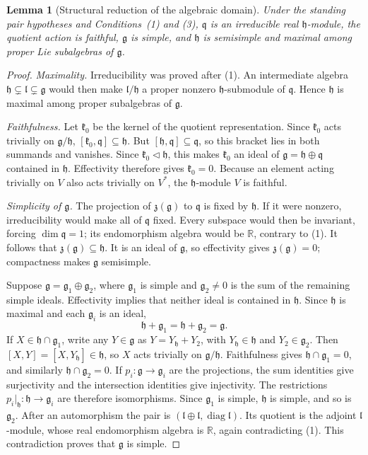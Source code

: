 \documentclass[11pt]{article}
\newtheorem{lemma}[theorem]{Lemma}
\theoremstyle{remark}
\newcommand{\g}{\mathfrak g}
\newcommand{\h}{\mathfrak h}
\newcommand{\q}{\mathfrak q}
\begin{document}
\begin{lemma}[Structural reduction of the algebraic domain]
\label{lem:reduction}
Under the standing pair hypotheses and Conditions~\textup{(1)} and
\textup{(3)}, \(\q\) is an irreducible real
\(\h\)-module, the quotient action is faithful, \(\g\) is simple, and
\(\h\) is semisimple and maximal among proper Lie subalgebras of
\(\g\).
\end{lemma}
\begin{proof}
\emph{Maximality.}
Irreducibility was proved after (1). An intermediate algebra
\(\h\subsetneq\mathfrak l\subsetneq\g\) would then make
\(\mathfrak l/\h\) a proper nonzero \(\h\)-submodule of \(\q\).
Hence \(\h\) is maximal among proper subalgebras of \(\g\).

\emph{Faithfulness.}
Let \(\mathfrak k_0\) be the kernel of the quotient representation.
Since \(\mathfrak k_0\) acts trivially on \(\g/\h\),
\([\mathfrak k_0,\q]\subseteq\h\). But
\([\h,\q]\subseteq\q\), so this bracket lies in both summands and
vanishes. Since \(\mathfrak k_0\triangleleft\h\), this makes
\(\mathfrak k_0\) an ideal of \(\g=\h\oplus\q\) contained in \(\h\).
Effectivity therefore gives \(\mathfrak k_0=0\).
Because an element acting trivially on \(V\) also acts trivially on
\(V^*\), the \(\h\)-module \(V\) is faithful.

\emph{Simplicity of \(\g\).}
The projection of \(\mathfrak z(\g)\) to \(\q\) is fixed by \(\h\).
If it were nonzero, irreducibility would make all of \(\q\) fixed.
Every subspace would then be invariant, forcing \(\dim\q=1\); its
endomorphism algebra would be \(\mathbb R\), contrary to (1). It follows that
\(\mathfrak z(\g)\subseteq\h\).
It is an ideal of \(\g\), so effectivity gives
\(\mathfrak z(\g)=0\); compactness makes \(\g\) semisimple.

Suppose \(\g=\mathfrak g_1\oplus\mathfrak g_2\), where
\(\mathfrak g_1\) is simple and \(\mathfrak g_2\ne0\) is the sum of
the remaining simple ideals. Effectivity implies that
neither ideal is contained in \(\h\). Since \(\h\) is maximal and
each \(\mathfrak g_i\) is an ideal,
\[
 \h+\mathfrak g_1=\h+\mathfrak g_2=\g.
\]
If \(X\in\h\cap\mathfrak g_1\), write any \(Y\in\g\) as
\(Y=Y_{\h}+Y_2\), with \(Y_{\h}\in\h\) and
\(Y_2\in\mathfrak g_2\). Then \([X,Y]=[X,Y_{\h}]\in\h\), so
\(X\) acts trivially on \(\g/\h\). Faithfulness gives
\(\h\cap\mathfrak g_1=0\), and similarly
\(\h\cap\mathfrak g_2=0\). If
\(p_i:\g\to\mathfrak g_i\) are the projections, the sum identities
give surjectivity and the intersection identities give injectivity.
The restrictions \(p_i|_{\h}:\h\to\mathfrak g_i\) are therefore
isomorphisms. Since
\(\mathfrak g_1\) is simple, \(\h\) is simple, and so is
\(\mathfrak g_2\). After an automorphism the pair is
\((\mathfrak l\oplus\mathfrak l,\operatorname{diag}\mathfrak l)\).
Its quotient is the adjoint \(\mathfrak l\)-module, whose real
endomorphism algebra is \(\mathbb R\), again contradicting (1).
This contradiction proves that \(\g\) is simple.


\end{proof}
\end{document}
